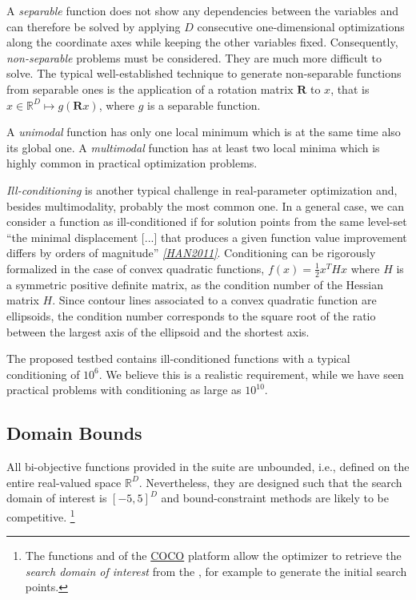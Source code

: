 \documentclass[letterpaper,12pt,english]{article}
\begin{document}
A \emph{separable} function does not show any dependencies between the
variables and can therefore be solved by applying \(D\) consecutive
one-dimensional optimizations along the coordinate axes while
keeping the other variables fixed. Consequently, \emph{non-separable}
problems must be considered. They are much more difficult to solve. The
typical well-established technique to generate non-separable
functions from separable ones is the application of a rotation matrix
\(\mathbf R\) to \(x\), that is \(x \in \mathbb{R}^D \mapsto g(\mathbf R x)\),
where \(g\) is a separable function.

A \emph{unimodal} function has only one local minimum which is at the same
time also its global one.
A \emph{multimodal} function has at least two local minima which is highly common
in practical optimization problems.

\emph{Ill-conditioning} is another typical challenge in real-parameter
optimization and, besides multimodality, probably the most common one.
In a general case, we can consider a function as ill-conditioned if for
solution points from the same level-set ``the minimal displacement {[}...{]} that
produces a given function value improvement differs by
orders of magnitude'' \label{index:id13}{\hyperref[index:han2011]{\emph{{[}HAN2011{]}}}}.
Conditioning can be rigorously formalized in the
case of convex quadratic functions,
\(f(x) = \frac{1}{2} x^THx\) where \(H\) is a symmetric
positive definite matrix, as the condition number of the Hessian matrix
\(H\). Since contour lines associated to a convex quadratic function
are ellipsoids, the condition number corresponds to the square root of
the ratio between the largest axis of the ellipsoid and the shortest axis.

The proposed  testbed contains ill-conditioned functions
with a typical conditioning of \(10^6\). We believe this is a realistic
requirement, while we have seen practical problems with conditioning
as large as \(10^{10}\).


\subsection{Domain Bounds}
\label{index:domain-bounds}
All bi-objective functions provided in the  suite are unbounded, i.e., defined
on the entire real-valued space \(\mathbb{R}^D\).
Nevertheless, they are designed such that the search domain of interest is \([-5,5]^D\)
and bound-constraint methods are likely to be competitive. \footnote[3]{
The functions \href{http://numbbo.github.io/coco-doc/C/coco\_8h.html\#a4ea6c067adfa866b0179329fe9b7c458}{} and
\href{http://numbbo.github.io/coco-doc/C/coco\_8h.html\#a29c89e039494ae8b4f8e520cba1eb154}{}
of the \href{https://github.com/numbbo/coco}{COCO} platform allow the optimizer
to retrieve the \emph{search domain of interest} from the \href{http://numbbo.github.io/coco-doc/C/coco\_8h.html\#a408ba01b98c78bf5be3df36562d99478}{},
for example to generate the initial search points.
}
\end{document}
